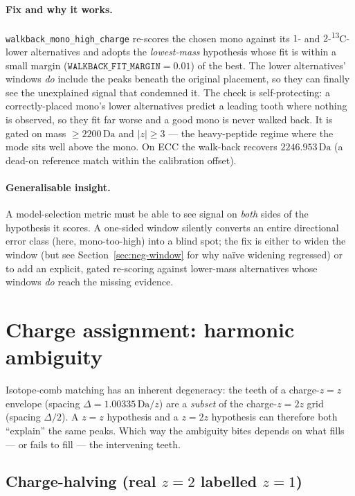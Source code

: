 \documentclass[11pt]{article}
\newcommand{\Da}{\,\text{Da}}
\newcommand{\Cthirteen}{\textsuperscript{13}C}
\newcommand{\zeq}[1]{\ensuremath{z{=}#1}}
\begin{document}
\paragraph{Fix and why it works.} \texttt{walkback\_mono\_high\_charge} re-scores the chosen mono
against its $1$- and $2$-\Cthirteen-lower alternatives and adopts the \emph{lowest-mass} hypothesis
whose fit is within a small margin ($\texttt{WALKBACK\_FIT\_MARGIN} = 0.01$) of the best. The lower
alternatives' windows \emph{do} include the peaks beneath the original placement, so they can finally
see the unexplained signal that condemned it. The check is self-protecting: a correctly-placed mono's
lower alternatives predict a leading tooth where nothing is observed, so they fit far worse and a good
mono is never walked back. It is gated on mass $\geq 2200\Da$ and $|z| \geq 3$ --- the heavy-peptide
regime where the mode sits well above the mono. On ECC the walk-back recovers $2246.953\Da$ (a dead-on
reference match within the calibration offset).

\paragraph{Generalisable insight.} A model-selection metric must be able to see signal on
\emph{both} sides of the hypothesis it scores. A one-sided window silently converts an entire
directional error class (here, mono-too-high) into a blind spot; the fix is either to widen the
window (but see Section~\ref{sec:neg-window} for why na\"ive widening regressed) or to add an
explicit, gated re-scoring against lower-mass alternatives whose windows \emph{do} reach the
missing evidence.

\section{Charge assignment: harmonic ambiguity}
\label{sec:charge}

Isotope-comb matching has an inherent degeneracy: the teeth of a charge-\zeq{z} envelope
(spacing $\Delta = 1.00335\Da / z$) are a \emph{subset} of the charge-\zeq{2z} grid (spacing
$\Delta/2$). A \zeq{z} hypothesis and a \zeq{2z} hypothesis can therefore both ``explain'' the
same peaks. Which way the ambiguity bites depends on what fills --- or fails to fill --- the
intervening teeth.

\subsection{Charge-halving (real \boldmath\zeq{2} labelled \zeq{1})}
\label{sec:halving}
\end{document}
